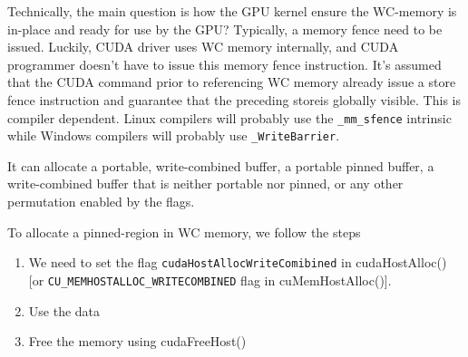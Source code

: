 Technically, the main question is how the GPU kernel ensure the WC-memory is
in-place and ready for use by the GPU? Typically, a memory fence need to be
issued. Luckily, CUDA driver uses WC memory internally, and CUDA programmer
doesn't have to issue this memory fence instruction. It's assumed that the CUDA
command prior to referencing WC memory already issue a store fence instruction
and guarantee that the preceding storeis globally visible. This is compiler
dependent. Linux compilers will probably use the \verb!_mm_sfence! intrinsic
while Windows compilers will probably use \verb!_WriteBarrier!.

\begin{framed}
It can allocate a portable, write-combined buffer, a portable pinned buffer, a
write-combined buffer that is neither portable nor pinned, or any other
permutation enabled by the flags. 
\end{framed}

To allocate a pinned-region in WC memory, we follow the steps
\begin{enumerate}
  \item We need to set the flag \verb!cudaHostAllocWriteComibined! in cudaHostAlloc()
[or \verb!CU_MEMHOSTALLOC_WRITECOMBINED! flag in cuMemHostAlloc()].
  
  \item Use the data 
  \item Free the memory using cudaFreeHost() 
\end{enumerate}

 

